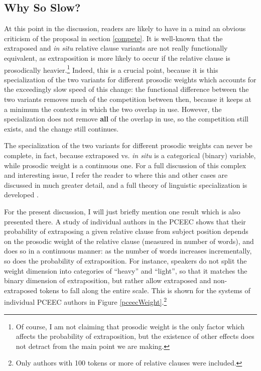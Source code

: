 \subsection{Why So Slow?}
\label{slow}

At this point in the discussion, readers are likely to have in a mind an obvious criticism of the proposal in section \ref{compete}. It is well-known that the extraposed and \textsl{in situ} relative clause variants are not really functionally equivalent, as extraposition is more likely to occur if the relative clause is prosodically heavier.\footnote{Of course, I am not claiming that prosodic weight is the only factor which affects the probability of extraposition, but the existence of other effects does not detract from the main point we are making.} Indeed, this is a crucial point, because it is this specialization of the two variants for different prosodic weights which accounts for the exceedingly slow speed of this change: the functional difference between the two variants removes much of the competition between then, because it keeps at a minimum the contexts in which the two overlap in use. However, the specialization does not remove \textbf{all} of the overlap in use, so the competition still exists, and the change still continues.

The specialization of the two variants for different prosodic weights can never be complete, in fact, because extraposed vs. \textsl{in situ} is a categorical (binary) variable, while prosodic weight is a continuous one. For a full discussion of this complex and interesting issue, I refer the reader to \citet{fruehwaldwallenberginprep} where this and other cases are discussed in much greater detail, and a full theory of linguistic specialization is developed \citep[see also][]{fruehwaldwallenberg2013, wallenberg2013b}.

For the present discussion, I will just briefly mention one result which is also presented there. A study of individual authors in the PCEEC shows that their probability of extraposing a given relative clause from subject position depends on the prosodic weight of the relative clause (measured in number of words), and does so in a continuous manner: as the number of words increases incrementally, so does the probability of extraposition. For instance, speakers do not split the weight dimension into categories of ``heavy'' and ``light'', so that it matches the binary dimension of extraposition, but rather allow extraposed and non-extraposed tokens to fall along the entire scale. This is shown for the systems of individual PCEEC authors in Figure \ref{pceecWeight}.\footnote{Only authors with 100 tokens or more of relative clauses were included.}

